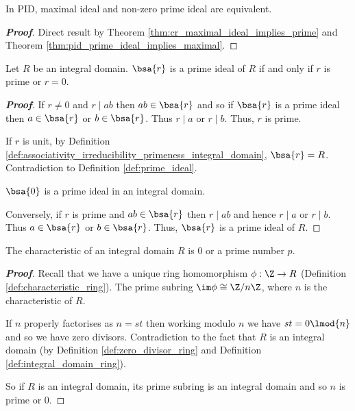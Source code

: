 \begin{theorem}\label{thm:pid_prime_ideal_equals_maximal}
In PID, maximal ideal and non-zero prime ideal are equivalent.
\end{theorem}

\begin{proof}[\bf Proof]
Direct result by Theorem \ref{thm:cr_maximal_ideal_implies_prime} and Theorem \ref{thm:pid_prime_ideal_implies_maximal}.
\end{proof}



\begin{lemma}\label{lem:prime_ideal_prime_ring_element}
Let $R$ be an integral domain. $\bsa{r}$ is a prime ideal of $R$ if and only if $r$ is prime or $r = 0$.
\end{lemma}

\begin{proof}[\bf Proof]
If $r \neq 0$ and $r \mid ab$ then $ab \in \bsa{r}$ and so if $\bsa{r}$ is a prime ideal then $a \in \bsa{r}$ or $b \in \bsa{r}$. Thus $r \mid a$ or $r \mid b$. Thus, $r$ is prime.

If $r$ is unit, by Definition \ref{def:associativity_irreducibility_primeness_integral_domain}, $\bsa{r} = R$. Contradiction to Definition \ref{def:prime_ideal}.

$\bsa{0}$ is a prime ideal in an integral domain.

Conversely, if $r$ is prime and $ab \in \bsa{r}$ then $r \mid ab$ and hence $r \mid a$ or $r \mid b$. Thus $a \in \bsa{r}$ or $b \in \bsa{r}$. Thus, $\bsa{r}$ is a prime ideal of $R$.
\end{proof}


\begin{lemma}
The characteristic of an integral domain $R$ is 0 or a prime number $p$.
\end{lemma}

\begin{proof}[\bf Proof]
Recall that we have a unique ring homomorphism $\phi: \Z \to R$ (Definition \ref{def:characteristic_ring}). The prime subring $\im \phi \cong \Z/n\Z$, where $n$ is the characteristic of $R$.

If $n$ properly factorises as $n = st$ then working modulo $n$ we have $st = 0 \lmod{n}$ and so we have zero divisors. Contradiction to the fact that $R$ is an integral domain (by Definition \ref{def:zero_divisor_ring} and Definition \ref{def:integral_domain_ring}).

So if $R$ is an integral domain, its prime subring is an integral domain and so $n$ is prime or 0.
\end{proof}



